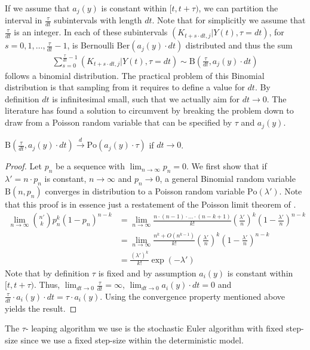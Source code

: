 If we assume that $a_j(y)$ is constant within $[t, t+\tau)$, we can partition the interval in $\frac{\tau}{dt}$ subintervals with length $dt$. Note that for simplicitly we assume that $\frac{\tau}{dt}$ is an integer. In each of these subintervals $\left(K_{t+s \cdot dt,j}|Y(t), \tau =dt\right)$, for $s=0, 1, \dots, \frac{\tau}{dt} - 1$, is Bernoulli $\mathrm{Ber}(a_j(y) \cdot dt)$ distributed and thus the sum
\begin{align*}
\sum_{s=0}^{\frac{\tau}{dt}-1} \left(K_{t+s \cdot dt, j} | Y(t), \tau = dt\right) \sim \textrm{B}\left(\frac{\tau}{dt}, a_j(y) \cdot dt\right)
\end{align*}
follows a binomial distribution. The practical problem of this Binomial distribution is that sampling from it requires to define a value for $dt$. By definition $dt$ is infinitesimal small, such that we actually aim for $dt \to 0$. The literature has found a solution to circumvent by breaking the problem down to draw from a Poisson random variable that can be specified by $\tau$ and $a_j(y)$.
\begin{theorem}
$\textrm{B}\left(\frac{\tau}{dt}, a_j(y) \cdot dt\right) \xrightarrow{d} \textrm{Po}(a_j(y) \cdot \tau)$ if $dt \to 0$.
\end{theorem}
\begin{proof}
Let $p_n$ be a sequence with $\lim_{n \to \infty} p_n = 0$. We first show that if $\lambda'=n \cdot p_n$ is constant, $n \to \infty$ and $p_n \to 0$, a general Binomial random variable $\textrm{B}(n, p_n)$ converges in distribution to a Poisson random variable $\textrm{Po}(\lambda')$. Note that this proof is in essence just a restatement of the Poisson limit theorem of \cite{Poisson.1835}.
\begin{align*}
\lim_{n \to \infty} \binom{n'}{k} p^k_n (1-p_n)^{n-k} &= \lim_{n \to \infty} \frac{n \cdot (n-1) \cdot \hdots \cdot (n-k+1)}{k!} \left(\frac{\lambda'}{n} \right)^k \left(1-\frac{\lambda'}{n} \right)^{n-k} \\
&= \lim_{n \to \infty} \frac{n^k + O(n^{k-1})}{k!} \left(\frac{\lambda'}{n} \right)^k \left(1-\frac{\lambda'}{n} \right)^{n-k} \\
&= \frac{\left(\lambda'\right)^k}{k!} \exp{(-\lambda')}
\end{align*}
Note that by definition $\tau$ is fixed and by assumption $a_i(y)$ is constant within $[t, t+\tau)$. Thus, $\lim_{dt \to 0} \frac{\tau}{dt} = \infty$, $\lim_{dt \to 0} a_i(y) \cdot dt = 0$ and $\frac{\tau}{dt} \cdot a_i(y) \cdot dt = \tau \cdot a_i(y)$. Using the convergence property mentioned above yields the result.
\end{proof}
The $\tau$- leaping algorithm we use is the stochastic Euler algorithm with fixed step-size since we use a fixed step-size within the deterministic model. \\

